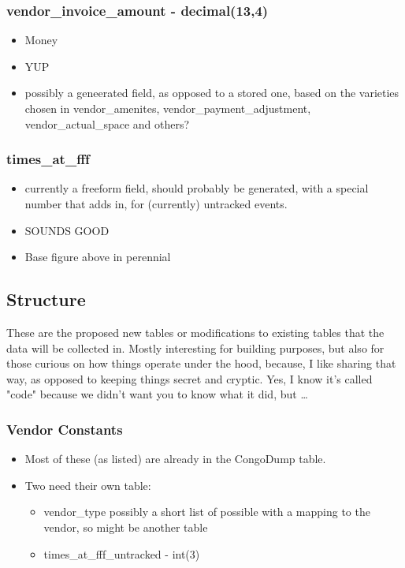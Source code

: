 \documentclass[captions=tablesignature]{scrartcl}
\begin{document}
\subsubsection{vendor\_invoice\_amount - decimal(13,4)}
\label{sec-2-4-1}
\begin{itemize}
\item Money
\item YUP
\item possibly a geneerated field, as opposed to a stored one, based
on the varieties chosen in vendor\_amenites,
vendor\_payment\_adjustment, vendor\_actual\_space and others?
\end{itemize}

\subsubsection{times\_at\_fff}
\label{sec-2-4-2}
\begin{itemize}
\item currently a freeform field, should probably be generated, with a
special number that adds in, for (currently) untracked events.
\item SOUNDS GOOD
\item Base figure above in perennial
\end{itemize}

\subsection{Structure}
\label{sec-2-5}
These are the proposed new tables or modifications to existing
tables that the data will be collected in.  Mostly interesting for
building purposes, but also for those curious on how things operate
under the hood, because, I like sharing that way, as opposed to
keeping things secret and cryptic.  Yes, I know it's called "code"
because we didn't want you to know what it did, but \ldots{} 
\subsubsection{Vendor Constants}
\label{sec-2-5-1}
\begin{itemize}
\item Most of these (as listed) are already in the CongoDump table.
\item Two need their own table:
\begin{itemize}
\item vendor\_type
possibly a short list of possible with a mapping to the
vendor, so might be another table
\item times\_at\_fff\_untracked - int(3)
\end{itemize}
\end{itemize}
\end{document}
